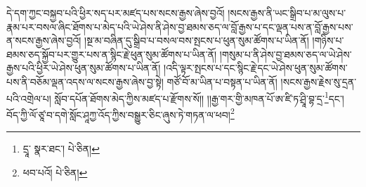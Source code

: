 དེ་དག་ཀྱང་བསྐྱབ་པའི་ཕྱིར་སད་པར་མཛད་པས་སངས་རྒྱས་ཞེས་བྱའོ། །སངས་རྒྱས་ནི་ཡང་སྒྲིབ་པ་མ་ལུས་པ་རྣམ་པར་བསལ་ཞིང་ཐོགས་པ་མེད་པའི་ཡེ་ཤེས་ནི་ཤེས་བྱ་ཐམས་ཅད་ལ་བློ་རྒྱས་པ་དང་ལྡན་པས་ན་བློ་རྒྱས་པས་ན་སངས་རྒྱས་ཞེས་བྱའོ། །སྔ་མ་བཞིན་དུ་སྒྲིབ་པ་བསལ་བས་སྤངས་པ་ཕུན་སུམ་ཚོགས་པ་ཡིན་ནོ། །གཉིས་པ་ཐམས་ཅད་སྐྱོབ་པར་གྱུར་པས་ན་སྙིང་རྗེ་ཕུན་སུམ་ཚོགས་པ་ཡིན་ནོ། །གསུམ་པ་ནི་ཤེས་བྱ་ཐམས་ཅད་ལ་ཡེ་ཤེས་རྒྱས་པའི་ཕྱིར་ཡེ་ཤེས་ཕུན་སུམ་ཚོགས་པ་ཡིན་ནོ། །འདི་ལྟར་སྤངས་པ་དང་སྙིང་རྗེ་དང་ཡེ་ཤེས་ཕུན་སུམ་ཚོགས་པས་ནི་བཅོམ་ལྡན་འདས་ལ་སངས་རྒྱས་ཞེས་བྱ་སྟེ། གཙོ་བོ་མ་ཡིན་པ་བསྟན་པ་ཡིན་ནོ། །སངས་རྒྱས་རྗེས་སུ་དྲན་པའི་འགྲེལ་པ། སློབ་དཔོན་ཐོགས་མེད་ཀྱིས་མཛད་པ་རྫོགས་སོ།། །།རྒྱ་གར་གྱི་མཁན་པོ་ཨ་ཛི་ཏ་ཤྲཱི་བྷ་དྲ་\footnote{དྲཱ་  སྣར་ཐང་།  པེ་ཅིན། }དང་། བོད་ཀྱི་ལོ་ཙཱ་བ་དགེ་སློང་ཤཱཀྱ་འོད་ཀྱིས་བསྒྱུར་ཅིང་ཞུས་ཏེ་གཏན་ལ་ཕབ།\footnote{ཕབ་པའོ།  པེ་ཅིན། } 